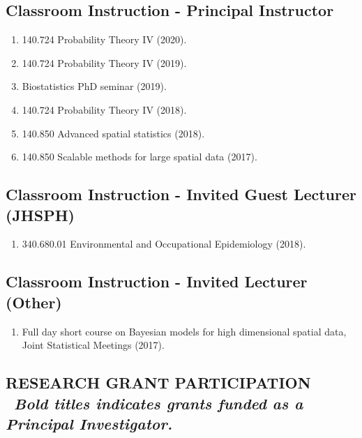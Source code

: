 \documentclass[10pt]{article}
\newcommand{\mydot}[1]{\begin{enumerate}[label=$\circ$,leftmargin=\parindent]\setlength{\itemsep}{#1}}
\newcommand{\ee}{\end{enumerate}}
\newcommand{\mylift}[1]{\vspace*{#1}}
\begin{document}
\mylift{-0.5em}

\subsection*{Classroom Instruction - Principal Instructor}

\mydot{-0.1em}

\item 140.724 Probability Theory IV (2020).
\item 140.724 Probability Theory IV (2019).
\item Biostatistics PhD seminar (2019).
\item 140.724 Probability Theory IV (2018).
\item 140.850 Advanced spatial statistics (2018).
\item 140.850 Scalable methods for large spatial data (2017).

\ee

\mylift{-1.5em}

\subsection*{Classroom Instruction - Invited Guest Lecturer (JHSPH)}

\mydot{-0.1em}

\item 340.680.01 Environmental and Occupational Epidemiology (2018).

\ee

\mylift{-1.5em}

\subsection*{Classroom Instruction - Invited Lecturer (Other)}

\mydot{-0.1em}

\item Full day short course on Bayesian models for high dimensional spatial data, Joint Statistical Meetings (2017). 

\ee

\subsection*{RESEARCH GRANT PARTICIPATION  \ {\small \em  Bold titles indicates grants funded as a Principal Investigator.}}  %

\smallskip
\end{document}
